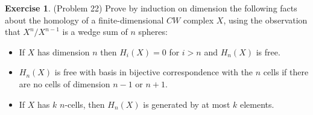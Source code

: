 \documentclass[12pt, psamsfonts]{amsart}
\theoremstyle{definition}
\newtheorem*{exer}{Exercise}
\theoremstyle{remark}
\numberwithin{equation}{section}
\begin{document}
\begin{exer}{(Problem 22)}
  Prove by induction on dimension the following facts about the homology of a finite-dimensional $CW$ complex $X$, using the observation that $X^n / X^{n-1}$ is a wedge sum of $n$ spheres:
  \begin{itemize}
    \item
      If $X$ has dimension $n$ then $H_i(X) = 0$ for $i > n$ and $H_n(X)$ is free.
    \item
      $H_n(X)$ is free with basis in bijective correspondence with the $n$ cells if there are no cells of dimension $n - 1$ or $n + 1$.
    \item
      If $X$ has $k$ $n$-cells, then $H_n(X)$ is generated by at most $k$ elements.
  \end{itemize}
\end{exer}
\end{document}
